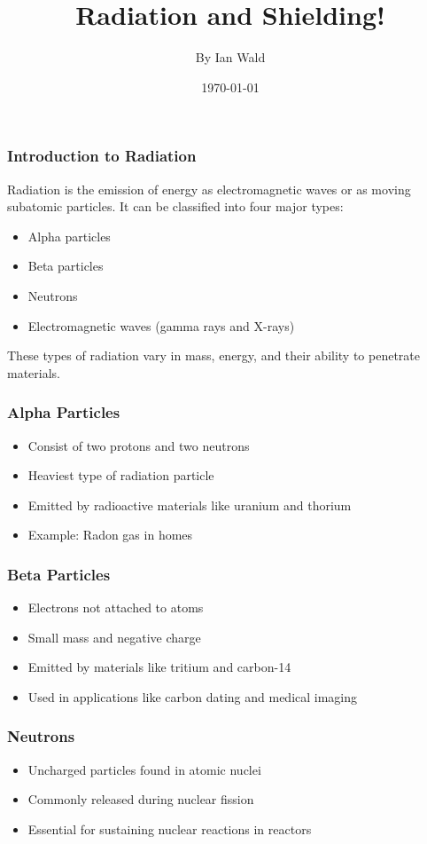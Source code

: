 \documentclass[aspectratio=169]{beamer}
\title{Radiation and Shielding!}
\author{By Ian Wald}
\date{\today}
\begin{document}
\frame{\titlepage}

\begin{frame}
\vspace{0.5cm}
\frametitle{Introduction to Radiation}
Radiation is the emission of energy as electromagnetic waves or as moving subatomic particles. It can be classified into four major types:
\begin{itemize}
    \item Alpha particles
    \item Beta particles
    \item Neutrons
    \item Electromagnetic waves (gamma rays and X-rays)
\end{itemize}
These types of radiation vary in mass, energy, and their ability to penetrate materials.
\end{frame}

\begin{frame}
\frametitle{Alpha Particles}
\begin{itemize}
    \item Consist of two protons and two neutrons
    \item Heaviest type of radiation particle
    \item Emitted by radioactive materials like uranium and thorium
    \item Example: Radon gas in homes
\end{itemize}
\end{frame}

\begin{frame}
\frametitle{Beta Particles}
\begin{itemize}
    \item Electrons not attached to atoms
    \item Small mass and negative charge
    \item Emitted by materials like tritium and carbon-14
    \item Used in applications like carbon dating and medical imaging
\end{itemize}
\end{frame}

\begin{frame}
\frametitle{Neutrons}
\begin{itemize}
    \item Uncharged particles found in atomic nuclei
    \item Commonly released during nuclear fission
    \item Essential for sustaining nuclear reactions in reactors
\end{itemize}
\end{frame}
\end{document}
